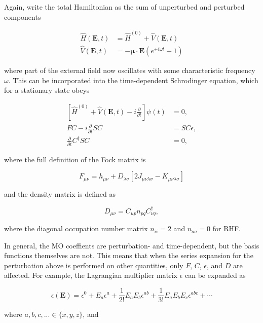 \documentclass[]{article}
\begin{document}
Again, write the total Hamiltonian as the sum of unperturbed and
perturbed components

\begin{align}
\hat{H}(\mathbf{E},t) &= \hat{H}^{(0)} + \hat{V}(\mathbf{E},t) \\
\hat{V}(\mathbf{E},t) &= -\mathbf{\mu} \cdot \mathbf{E}(e^{\pm i \omega t} + 1)
\end{align}

where part of the external field now oscillates with some characteristic
frequency \(\omega\). This can be incorporated into the time-dependent
Schrodinger equation, which for a stationary state obeys

\begin{align}
\left[ \hat{H}^{(0)} + \hat{V}(\mathbf{E},t) - i\frac{\partial}{\partial t} \right] \psi(t) &= 0, \\
FC - i \frac{\partial}{\partial t} SC &= SC\epsilon, \\
\frac{\partial}{\partial t} C^{\dagger} S C &= 0,
\end{align}

where the full definition of the Fock matrix is

\[
F_{\mu\nu} = h_{\mu\nu} + D_{\lambda\sigma}[2J_{\mu\nu\lambda\sigma} - K_{\mu\nu\lambda\sigma}]
\]

and the density matrix is defined as

\[
D_{\mu\nu} = C_{\mu p}n_{pq}C_{\nu q}^{\dagger},
\]

where the diagonal occupation number matrix \(n_{ii} = 2\) and
\(n_{aa} = 0\) for RHF.

In general, the MO coeffients are perturbation- and time-dependent, but
the basis functions themselves are not. This means that when the series
expansion for the perturbation above is performed on other quantities,
only \(F\), \(C\), \(\epsilon\), and \(D\) are affected. For example,
the Lagrangian multiplier matrix \(\epsilon\) can be expanded as

\[
\epsilon(\mathbf{E}) = \epsilon^0 + E_a\epsilon^a + \frac{1}{2!}E_aE_b\epsilon^{ab} + \frac{1}{3!}E_aE_bE_c\epsilon^{abc} + \cdots
\]

where \(a,b,c,...\in\{x,y,z\}\), and
\end{document}
